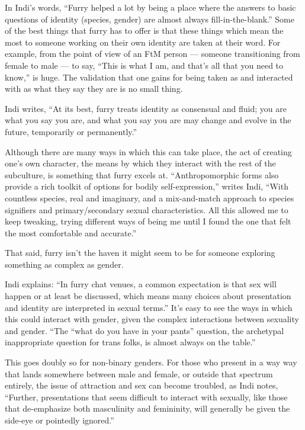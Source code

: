 In Indi's words, ``Furry helped a lot by being a place where the answers to basic questions of identity (species, gender) are almost always fill-in-the-blank.''  Some of the best things that furry has to offer is that these things which mean the most to someone working on their own identity are taken at their word. For example, from the point of view of an FtM person --- someone transitioning from female to male --- to say, ``This is what I am, and that's all that you need to know,'' is huge. The validation that one gains for being taken as and interacted with as what they say they are is no small thing.

Indi writes, ``At its best, furry treats identity as consensual and fluid; you are what you say you are, and what you say you are may change and evolve in the future, temporarily or permanently.''

Although there are many ways in which this can take place, the act of creating one's own character, the means by which they interact with the rest of the subculture, is something that furry excels at. ``Anthropomorphic forms also provide a rich toolkit of options for bodily self-expression,'' writes Indi, ``With countless species, real and imaginary, and a mix-and-match approach to species signifiers and primary/secondary sexual characteristics. All this allowed me to keep tweaking, trying different ways of being me until I found the one that felt the most comfortable and accurate.''

That said, furry isn't the haven it might seem to be for someone exploring something as complex as gender.

Indi explains: ``In furry chat venues, a common expectation is that sex will happen or at least be discussed, which means many choices about presentation and identity are interpreted in sexual terms.'' It's easy to see the ways in which this could interact with gender, given the complex interactions between sexuality and gender. ``The ``what do you have in your pants'' question, the archetypal inappropriate question for trans folks, is almost always on the table.''

This goes doubly so for non-binary genders. For those who present in a way way that lands somewhere between male and female, or outside that spectrum entirely, the issue of attraction and sex can become troubled, as Indi notes, ``Further, presentations that seem difficult to interact with sexually, like those that de-emphasize both masculinity and femininity, will generally be given the side-eye or pointedly ignored.''

